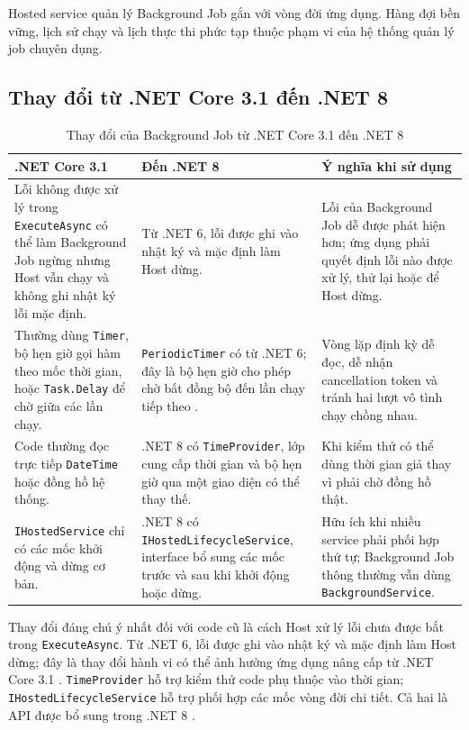 Hosted service quản lý Background Job gắn với vòng đời ứng dụng. Hàng đợi bền vững, lịch sử
chạy và lịch thực thi phức tạp thuộc phạm vi của hệ thống quản lý job chuyên dụng.

\subsection{Thay đổi từ .NET Core 3.1 đến .NET 8}

{\small
\begin{longtable}{|>{\raggedright\arraybackslash}p{}|
                  >{\raggedright\arraybackslash}p{}|
                  >{\raggedright\arraybackslash}p{}|}
\caption{Thay đổi của Background Job từ .NET Core 3.1 đến .NET 8}\label{tab:background-version}\\
\hline
\textbf{.NET Core 3.1} & \textbf{Đến .NET 8} & \textbf{Ý nghĩa khi sử dụng} \\
\hline
Lỗi không được xử lý trong \texttt{ExecuteAsync} có thể làm Background Job ngừng nhưng Host vẫn chạy và không ghi nhật ký lỗi mặc định. & Từ .NET 6, lỗi được ghi vào nhật ký và mặc định làm Host dừng. & Lỗi của Background Job dễ được phát hiện hơn; ứng dụng phải quyết định lỗi nào được xử lý, thử lại hoặc để Host dừng. \\
\hline
Thường dùng \texttt{Timer}, bộ hẹn giờ gọi hàm theo mốc thời gian, hoặc \texttt{Task.Delay} để chờ giữa các lần chạy. & \texttt{PeriodicTimer} có từ .NET 6; đây là bộ hẹn giờ cho phép chờ bất đồng bộ đến lần chạy tiếp theo \cite{ms-periodic-timer}. & Vòng lặp định kỳ dễ đọc, dễ nhận cancellation token và tránh hai lượt vô tình chạy chồng nhau. \\
\hline
Code thường đọc trực tiếp \texttt{DateTime} hoặc đồng hồ hệ thống. & .NET 8 có \texttt{TimeProvider}, lớp cung cấp thời gian và bộ hẹn giờ qua một giao diện có thể thay thế. & Khi kiểm thử có thể dùng thời gian giả thay vì phải chờ đồng hồ thật. \\
\hline
\texttt{IHostedService} chỉ có các mốc khởi động và dừng cơ bản. & .NET 8 có \texttt{IHostedLifecycleService}, interface bổ sung các mốc trước và sau khi khởi động hoặc dừng. & Hữu ích khi nhiều service phải phối hợp thứ tự; Background Job thông thường vẫn dùng \texttt{BackgroundService}. \\
\hline
\end{longtable}
}

Thay đổi đáng chú ý nhất đối với code cũ là cách Host xử lý lỗi chưa được bắt trong
\texttt{ExecuteAsync}. Từ .NET 6, lỗi được ghi vào nhật ký và mặc định làm Host dừng; đây là
thay đổi hành vi có thể ảnh hưởng ứng dụng nâng cấp từ .NET Core 3.1
\cite{ms-hosting-exception}. \texttt{TimeProvider} hỗ trợ kiểm thử code phụ thuộc
vào thời gian; \texttt{IHostedLifecycleService} hỗ trợ phối hợp các mốc vòng đời
chi tiết. Cả hai là API được bổ sung trong .NET 8
\cite{ms-time-provider,ms-hosted-lifecycle}.
